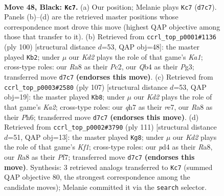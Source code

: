 \documentclass[11pt]{article}
\begin{document}
\clearpage

\begin{figure}[p]\centering
\begin{subfigure}{0.46\textwidth}\centering
\resizebox{\linewidth}{!}{%
\newchessgame
\chessboard[
  setfen={r5r1/p2k2pQ/7p/3p3P/pq1P2Pb/4P3/6K1/5N2 b - - 5 48},
  showmover=false,
  pgfstyle=straightmove, color=movearrow, markmove={d7-c7}
]}
\caption{}
\end{subfigure}\hfill
\begin{subfigure}{0.46\textwidth}\centering
\resizebox{\linewidth}{!}{%
\newchessgame
\chessboard[
  setfen={8/p4pk1/6p1/q1P4p/4RP2/P1R3P1/2P1p3/K7 w - - 10 51},
  showmover=false,
  pgfstyle=straightmove, color=movearrow, markmove={a1-b2}
]}
\caption{}
\end{subfigure}
\\[4pt]
\begin{subfigure}{0.46\textwidth}\centering
\resizebox{\linewidth}{!}{%
\newchessgame
\chessboard[
  setfen={2r5/k1p1R3/3p3p/Q1pP4/2P3q1/P4p2/1P6/1K6 b - - 5 54},
  showmover=false,
  pgfstyle=straightmove, color=movearrow, markmove={a7-b8}
]}
\caption{}
\end{subfigure}\hfill
\begin{subfigure}{0.46\textwidth}\centering
\resizebox{\linewidth}{!}{%
\newchessgame
\chessboard[
  setfen={r4k2/4rp2/1p1np2Q/7p/8/P4P1P/6P1/7K b - - 1 56},
  showmover=false,
  pgfstyle=straightmove, color=movearrow, markmove={f8-g8}
]}
\caption{}
\end{subfigure}
\caption{\textbf{Move 48, Black: \texttt{Kc7}.} (a) Our position; Melanie plays \texttt{Kc7} (\texttt{d7c7}). Panels (b)--(d) are the retrieved master positions whose correspondence most drove this move (highest QAP objective among those that transfer to it). (b) Retrieved from \texttt{ccrl\_top\_p0001\#1136} (ply 100) [structural distance $d$=53, QAP obj=48]: the master played \texttt{Kb2}; under $\mu$ our \emph{Kd2} plays the role of that game's \emph{Ka1}; cross-type roles: our \emph{R}a8 as their \emph{P}c2, our \emph{Q}b4 as their \emph{P}g3; transferred move \texttt{d7c7} \textbf{(endorses this move)}. (c) Retrieved from \texttt{ccrl\_top\_p0003\#2580} (ply 107) [structural distance $d$=53, QAP obj=19]: the master played \texttt{Kb8}; under $\mu$ our \emph{Kd2} plays the role of that game's \emph{Ka2}; cross-type roles: our \emph{q}h7 as their \emph{r}e7, our \emph{R}a8 as their \emph{P}h6; transferred move \texttt{d7c7} \textbf{(endorses this move)}. (d) Retrieved from \texttt{ccrl\_top\_p0002\#3790} (ply 111) [structural distance $d$=51, QAP obj=13]: the master played \texttt{Kg8}; under $\mu$ our \emph{Kd2} plays the role of that game's \emph{Kf1}; cross-type roles: our \emph{p}d4 as their \emph{R}a8, our \emph{R}a8 as their \emph{P}f7; transferred move \texttt{d7c7} \textbf{(endorses this move)}. Synthesis: 3 retrieved analogs transferred to \texttt{Kc7} (summed QAP objective 80, the strongest correspondence among the candidate moves); Melanie committed it via the \texttt{search} selector.}
\label{fig:thought-m95}
\end{figure}
\end{document}

